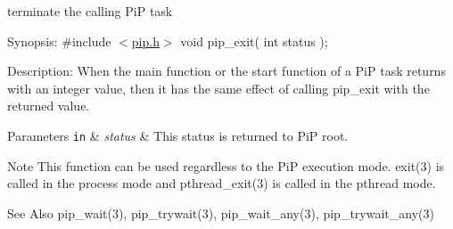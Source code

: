 terminate the calling Pi\-P task

\begin{DoxyParagraph}{Synopsis\-:}
\#include $<$\hyperlink{pip_8h_source}{pip.\-h}$>$ void pip\-\_\-exit( int status );
\end{DoxyParagraph}
\begin{DoxyParagraph}{Description\-:}
When the main function or the start function of a Pi\-P task returns with an integer value, then it has the same effect of calling {\ttfamily pip\-\_\-exit} with the returned value.
\end{DoxyParagraph}

\begin{DoxyParams}[1]{Parameters}
\mbox{\tt in}  & {\em status} & This status is returned to Pi\-P root.\\
\hline
\end{DoxyParams}
\begin{DoxyNote}{Note}
This function can be used regardless to the Pi\-P execution mode. {\ttfamily exit(3)} is called in the process mode and {\ttfamily pthread\-\_\-exit(3)} is called in the pthread mode.
\end{DoxyNote}
\begin{DoxySeeAlso}{See Also}
pip\-\_\-wait(3), pip\-\_\-trywait(3), pip\-\_\-wait\-\_\-any(3), pip\-\_\-trywait\-\_\-any(3) 
\end{DoxySeeAlso}
